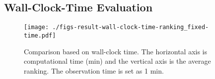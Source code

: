
\subsection{Wall-Clock-Time Evaluation}
\label{ssec:wall-clock-time}

\begin{figure}[t]
  \centering
 \texttt{[image: ./figs-result-wall-clock-time-ranking\_fixed-time.pdf]}
 \caption{
 Comparison based on wall-clock time.
 The horizontal axis is computational time (min) and the vertical axis is the average ranking.
 The observation time is set as 1 min.
 }
  \label{fig:wall-clock_time}
\end{figure}



